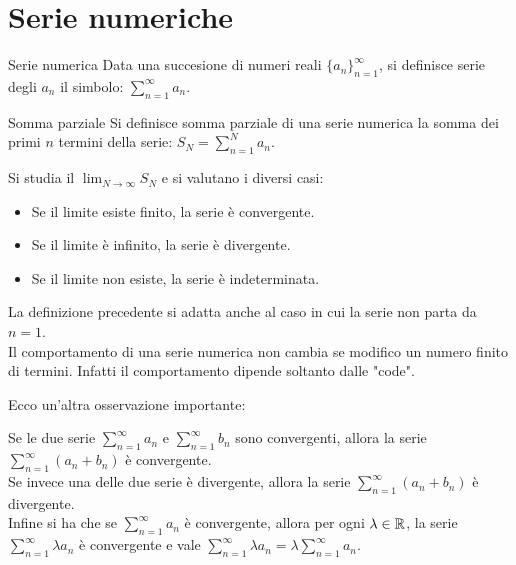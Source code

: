 \chapter{Serie numeriche}

\begin{definizione}{Serie numerica}
  Data una succesione di numeri reali $\{a_n\}_{n=1}^{\infty}$, si definisce serie degli $a_n$ il simbolo: $\sum_{n=1}^{\infty} a_n$.
\end{definizione}

\begin{definizione}{Somma parziale}
  Si definisce somma parziale di una serie numerica la somma dei primi $n$ termini della serie: $S_N = \sum_{n=1}^{N} a_n$.
\end{definizione}

Si studia il $\lim_{N \to \infty} S_N$ e si valutano i diversi casi:
\begin{itemize}
  \item Se il limite esiste finito, la serie è convergente.
  \item Se il limite è infinito, la serie è divergente.
  \item Se il limite non esiste, la serie è indeterminata.
\end{itemize}

\begin{osservazione}{}
  La definizione precedente si adatta anche al caso in cui la serie non parta da $n=1$.\\
  Il comportamento di una serie numerica non cambia se modifico un numero finito di termini. Infatti il comportamento dipende soltanto dalle "code".
\end{osservazione}

Ecco un'altra osservazione importante:
\begin{osservazione}{}
  Se le due serie $\sum_{n=1}^{\infty} a_n$ e $\sum_{n=1}^{\infty} b_n$ sono convergenti, allora la serie $\sum_{n=1}^{\infty} (a_n + b_n)$ è convergente.\\ Se invece una delle due serie è divergente, allora la serie $\sum_{n=1}^{\infty} (a_n + b_n)$ è divergente.\\
  Infine si ha che se $\sum_{n=1}^{\infty} a_n$ è convergente, allora per ogni $\lambda \in \mathbb{R}$, la serie $\sum_{n=1}^{\infty} \lambda a_n$ è convergente e vale $\sum_{n=1}^{\infty} \lambda a_n = \lambda \sum_{n=1}^{\infty} a_n$.
\end{osservazione}


